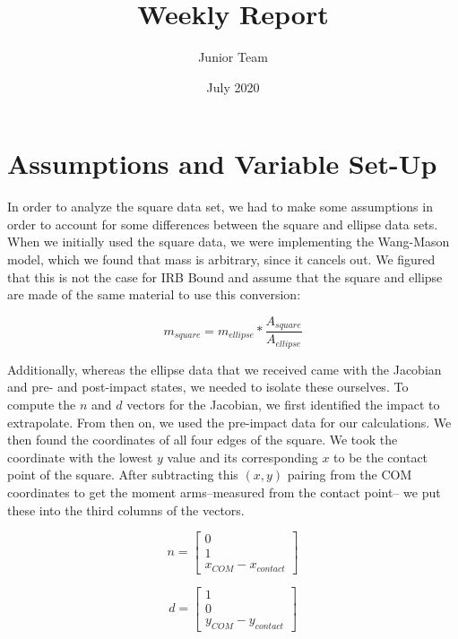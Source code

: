 \documentclass{article}
\title{Weekly Report}
\author{Junior Team }
\date{July 2020}
\begin{document}
\maketitle

\section{Assumptions and Variable Set-Up}
In order to analyze the square data set, we had to make some assumptions in order to account for some differences between the square and ellipse data sets. When we initially used the square data, we were implementing the Wang-Mason model, which we found that mass is arbitrary, since it cancels out. We figured that this is not the case for IRB Bound and assume that the square and ellipse are made of the same material to use this conversion: 

\begin{equation}
    m_{square} = m_{ellipse} * \frac{A_{square}}{A_{ellipse}}
\end{equation}

\noindent Additionally, whereas the ellipse data that we received came with the Jacobian and pre- and post-impact states, we needed to isolate these ourselves. To compute the $n$ and $d$ vectors for the Jacobian, we first identified the impact to extrapolate. From then on, we used the pre-impact data for our calculations. We then found the coordinates of all four edges of the square. We took the coordinate with the lowest $y$ value and its corresponding $x$ to be the contact point of the square. After subtracting this $(x, y)$ pairing from the COM coordinates to get the moment arms--measured from the contact point-- we put these into the third columns of the vectors. 

\begin{equation}
n = 
\begin{bmatrix} 
 0 \\
 1 \\
 x_{COM}-x_{contact} 
\end{bmatrix}
\end{equation}

\begin{equation}
d = 
\begin{bmatrix} 
 1 \\
 0 \\
 y_{COM}-y_{contact} 
\end{bmatrix}
\end{equation}
\end{document}
